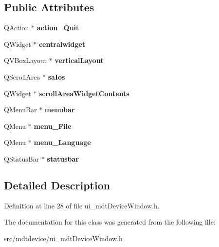\subsection*{Public Attributes}
\begin{DoxyCompactItemize}
\item 
\hypertarget{class_ui__mdt_device_window_a9eef553afdbb5add9df9ddf09b46d598}{
QAction $\ast$ {\bfseries action\_\-Quit}}
\label{class_ui__mdt_device_window_a9eef553afdbb5add9df9ddf09b46d598}

\item 
\hypertarget{class_ui__mdt_device_window_ad43c2b08a1dad506369adf975eab9fcd}{
QWidget $\ast$ {\bfseries centralwidget}}
\label{class_ui__mdt_device_window_ad43c2b08a1dad506369adf975eab9fcd}

\item 
\hypertarget{class_ui__mdt_device_window_a93289e261d8474f5c3c627fd98e5618b}{
QVBoxLayout $\ast$ {\bfseries verticalLayout}}
\label{class_ui__mdt_device_window_a93289e261d8474f5c3c627fd98e5618b}

\item 
\hypertarget{class_ui__mdt_device_window_a20450234862772ffcf7d6ca5ba903aa1}{
QScrollArea $\ast$ {\bfseries saIos}}
\label{class_ui__mdt_device_window_a20450234862772ffcf7d6ca5ba903aa1}

\item 
\hypertarget{class_ui__mdt_device_window_a3389de056f2567855e29bc37becf052e}{
QWidget $\ast$ {\bfseries scrollAreaWidgetContents}}
\label{class_ui__mdt_device_window_a3389de056f2567855e29bc37becf052e}

\item 
\hypertarget{class_ui__mdt_device_window_add99fb8eb3acdf89f4f2fca08313e356}{
QMenuBar $\ast$ {\bfseries menubar}}
\label{class_ui__mdt_device_window_add99fb8eb3acdf89f4f2fca08313e356}

\item 
\hypertarget{class_ui__mdt_device_window_a088b11fa8e9aa435204bac4d9ffc466e}{
QMenu $\ast$ {\bfseries menu\_\-File}}
\label{class_ui__mdt_device_window_a088b11fa8e9aa435204bac4d9ffc466e}

\item 
\hypertarget{class_ui__mdt_device_window_a45c608b27713d71d937f7c21c5f90e9f}{
QMenu $\ast$ {\bfseries menu\_\-Language}}
\label{class_ui__mdt_device_window_a45c608b27713d71d937f7c21c5f90e9f}

\item 
\hypertarget{class_ui__mdt_device_window_a7a212839bf52a75a6a0213fa2fb9a307}{
QStatusBar $\ast$ {\bfseries statusbar}}
\label{class_ui__mdt_device_window_a7a212839bf52a75a6a0213fa2fb9a307}

\end{DoxyCompactItemize}


\subsection{Detailed Description}


Definition at line 28 of file ui\_\-mdtDeviceWindow.h.



The documentation for this class was generated from the following file:\begin{DoxyCompactItemize}
\item 
src/mdtdevice/ui\_\-mdtDeviceWindow.h\end{DoxyCompactItemize}
